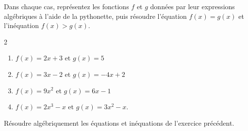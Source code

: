\documentclass[main.tex]{subfiles}
\begin{document}
 
\begin{exercise}\hfill 
	
Dans chaque cas, représentez les fonctions $f$ et $g$ données par leur expressions algébriques à l'aide de la pythonette, puis résoudre l'équation $f(x)=g(x)$ et l'inéquation $f(x)>g(x)$.
\begin{multicols}{2} 
\begin{enumerate}[label=\arabic*), leftmargin=*]
	\item $f(x)= 2x+3$ et $g(x)=5$
	\item $f(x)=3x-2$ et $g(x)=-4x+2$
	\item $f(x)=9x^2$ et $g(x)=6x-1$
	\item $f(x)=2x^3-x$ et $g(x)=3x^2-x$.
\end{enumerate}
\end{multicols}
\end{exercise}
\begin{exercise}
	Résoudre algébriquement les équations et inéquations de l'exercice précédent.
\end{exercise}

 

\newpage 
{}  
\pagestyle{scrheadings} %
\onehalfspacing
\newpage 
\end{document}
